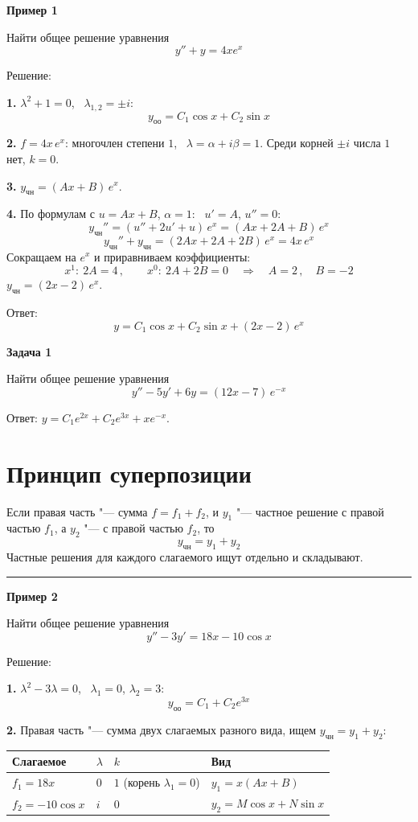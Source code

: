 \documentclass[11pt,a4paper]{article}
\newcommand{\example}[1]{\par\medskip\noindent\textbf{#1}\par\nopagebreak\smallskip}
\newcommand{\yoo}{y_{\text{оо}}}
\newcommand{\ych}{y_{\text{чн}}}
\begin{document}
\example{Пример 1}

Найти общее решение уравнения
\[
  y'' + y = 4x e^{x}
\]

Решение:

\textbf{1.} $\lambda^2 + 1 = 0$, \ $\lambda_{1,2} = \pm i$:
\[
  \yoo = C_1\cos x + C_2\sin x
\]

\textbf{2.} $f = 4x\, e^{x}$: многочлен степени $1$, \ $\lambda = \alpha + i\beta=1$. Среди корней $\pm i$ числа $1$ нет, $k = 0$.

\textbf{3.} $\ych = (Ax + B)\, e^{x}$.

\textbf{4.} По формулам с $u = Ax + B$, $\alpha = 1$: \ $u' = A$, $u'' = 0$:
\[
  \ych'' = (u'' + 2u' + u)\, e^{x} = (Ax + 2A + B)\, e^{x}
\]
\[
  \ych'' + \ych = (2Ax + 2A + 2B)\, e^{x} = 4x\, e^{x}
\]
Сокращаем на $e^{x}$ и приравниваем коэффициенты:
\[
  x^1:\ 2A = 4\,, \qquad x^0:\ 2A + 2B = 0
  \quad\Rightarrow\quad
  A = 2\,, \quad B = -2
\]
$\ych = (2x - 2)\, e^{x}$.

Ответ:
\[
  y = C_1\cos x + C_2\sin x + (2x - 2)\, e^{x}
\]

\example{Задача 1}

Найти общее решение уравнения
\[
  y'' - 5y' + 6y = (12x - 7)\, e^{-x}
\]

Ответ: $y = C_1 e^{2x} + C_2 e^{3x} + x e^{-x}$.

\section*{Принцип суперпозиции}

Если правая часть "--- сумма $f = f_1 + f_2$, и $y_{1}$ "--- частное решение с правой частью $f_1$, а $y_{2}$ "--- с правой частью $f_2$, то
\[
  \ych = y_{1} + y_{2}
\]
Частные решения для каждого слагаемого ищут отдельно и складывают.

\medskip\hrule\medskip

\example{Пример 2}

Найти общее решение уравнения
\[
  y'' - 3y' = 18x - 10\cos x
\]

Решение:

\textbf{1.} $\lambda^2 - 3\lambda = 0$, \ $\lambda_1 = 0$, $\lambda_2 = 3$:
\[
  \yoo = C_1 + C_2 e^{3x}
\]

\textbf{2.} Правая часть "--- сумма двух слагаемых разного вида, ищем $\ych = y_1 + y_2$:
\begin{center}
\renewcommand{\arraystretch}{1.3}
\begin{tabular}{@{}llll@{}}
\toprule
Слагаемое & $\lambda$ & $k$ & Вид\\
\midrule
$f_1 = 18x$ & $0$ & $1$ (корень $\lambda_1 = 0$) & $y_1 = x(Ax + B)$\\
$f_2 = -10\cos x$ & $i$ & $0$ & $y_2 = M\cos x + N\sin x$\\
\bottomrule
\end{tabular}
\end{center}
\end{document}
